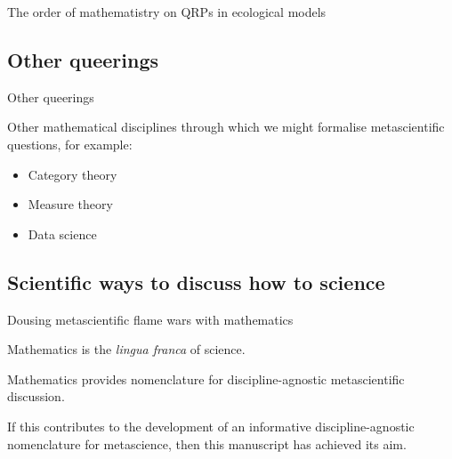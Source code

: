 \documentclass{beamer}
\begin{document}
\begin{frame}{\large{The order of mathematistry on QRPs in ecological models}}
\begin{adjustbox}{max totalsize={.9\textwidth}{.9\textheight},center}
\end{adjustbox}

\end{frame}



\subsection{Other queerings}

\begin{frame}{Other queerings}

Other mathematical disciplines through which we might formalise metascientific questions, for example:

\bigskip

\begin{itemize}
    \item Category theory
    \item Measure theory
    \item Data science
\end{itemize}

\end{frame}

\subsection{Scientific ways to discuss how to science}

\begin{frame}{Dousing metascientific flame wars with mathematics}
    
Mathematics is the \emph{lingua franca} of science.

\bigskip

Mathematics provides nomenclature for discipline-agnostic metascientific discussion.

\bigskip

If this contributes to the development of an informative discipline-agnostic nomenclature for metascience, then this manuscript has achieved its aim.
    
\end{frame}
\end{document}
